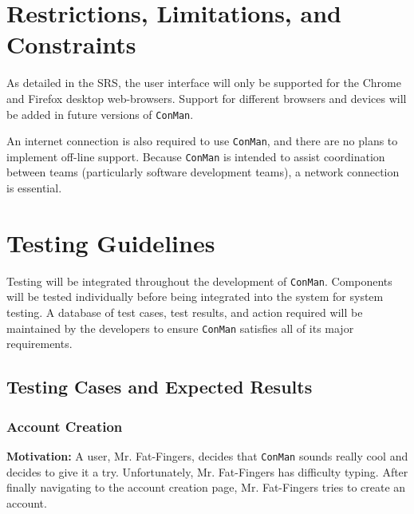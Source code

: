 \documentclass{article}
\begin{document}
\newpage
\section{Restrictions, Limitations, and Constraints}
As detailed in the SRS, the user interface will only be supported for the Chrome and Firefox desktop web-browsers.
Support for different browsers and devices will be added in future versions of \texttt{ConMan}.

An internet connection is also required to use \texttt{ConMan}, and there are no plans to implement off-line support.
Because \texttt{ConMan} is intended to assist coordination between teams (particularly software development teams), a network connection is essential.
\newpage
\section{Testing Guidelines}
Testing will be integrated throughout the development of \texttt{ConMan}.  Components will be tested individually before being integrated into the system for system testing.
A database of test cases, test results, and action required will be maintained by the developers to ensure \texttt{ConMan} satisfies all of its major requirements.

\subsection{Testing Cases and Expected Results}
\subsubsection{Account Creation}
\textbf{Motivation:}  A user, Mr. Fat-Fingers, decides that \texttt{ConMan} sounds really cool and decides to give it a try.  Unfortunately, Mr. Fat-Fingers has difficulty typing.  After finally navigating to the account creation page, Mr. Fat-Fingers tries to create an account.  
\end{document}
